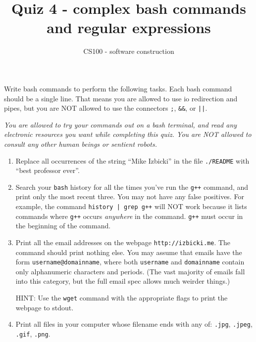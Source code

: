 \documentclass{article}
\title{Quiz 4 - complex bash commands and regular expressions}
\author{CS100 - software construction}
\begin{document}
\maketitle

\noindent
Write bash commands to perform the following tasks.
Each bash command should be a single line.
That means you are allowed to use io redirection and pipes, but you are NOT allowed to use the connectors \lstinline{;}, \lstinline{&&}, or \lstinline{||}.

\vspace{0.15in}
\noindent
\emph{You are allowed to try your commands out on a bash terminal, and read any electronic resources you want while completing this quiz.
You are NOT allowed to consult any other human beings or sentient robots.
}

\begin{enumerate}
\item
Replace all occurrences of the string ``Mike Izbicki'' in the file \lstinline{./README} with ``best professor ever''.
\vspace{3in}

\item
Search your \lstinline{bash} history for all the times you've run the \lstinline{g++} command, and print only the most recent three.
You may not have any false positives.
For example, the command \lstinline{history | grep g++} will NOT work because it lists commands where \lstinline{g++} occurs \emph{anywhere} in the command.
\lstinline{g++} must occur in the beginning of the command.

\vspace{3in}

\newpage
\item
Print all the email addresses on the webpage \lstinline{http://izbicki.me}.
The command should print nothing else.
You may assume that emails have the form \lstinline{username@domainname}, where both \lstinline{username} and \lstinline{domainname} contain only alphanumeric characters and periods.
(The vast majority of emails fall into this category, but the full email spec allows much weirder things.)

HINT: Use the \lstinline{wget} command with the appropriate flags to print the webpage to stdout.

\vspace{3in}

\item
Print all files in your computer whose filename ends with any of:
\lstinline{.jpg},
\lstinline{.jpeg},
\lstinline{.gif},
\lstinline{.png}.

\end{enumerate}
\end{document}
